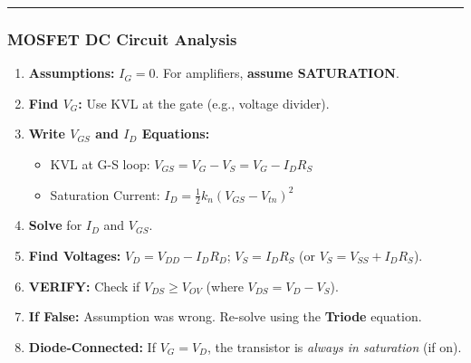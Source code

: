 \documentclass[10pt, letterpaper]{article}
\begin{document}
\hrule

\subsubsection*{MOSFET DC Circuit Analysis}
\begin{enumerate}
    \item \textbf{Assumptions:} $I_G = 0$. For amplifiers, \textbf{assume SATURATION}.
    \item \textbf{Find $V_G$:} Use KVL at the gate (e.g., voltage divider).
    \item \textbf{Write $V_{GS}$ and $I_D$ Equations:}
    \begin{itemize}
        \item KVL at G-S loop: $V_{GS} = V_G - V_S = V_G - I_D R_S$
        \item Saturation Current: $I_D = \frac{1}{2} k_n (V_{GS} - V_{tn})^2$
    \end{itemize}
    \item \textbf{Solve} for $I_D$ and $V_{GS}$.
    \item \textbf{Find Voltages:} $V_D = V_{DD} - I_D R_D$; $V_S = I_D R_S$ (or $V_S = V_{SS} + I_D R_S$).
    \item \textbf{VERIFY:} Check if $V_{DS} \ge V_{OV}$ (where $V_{DS} = V_D - V_S$).
    \item \textbf{If False:} Assumption was wrong. Re-solve using the \textbf{Triode} equation.
    \item \textbf{Diode-Connected:} If $V_G = V_D$, the transistor is \textit{always in saturation} (if on).
\end{enumerate}

\newpage

\end{document}
